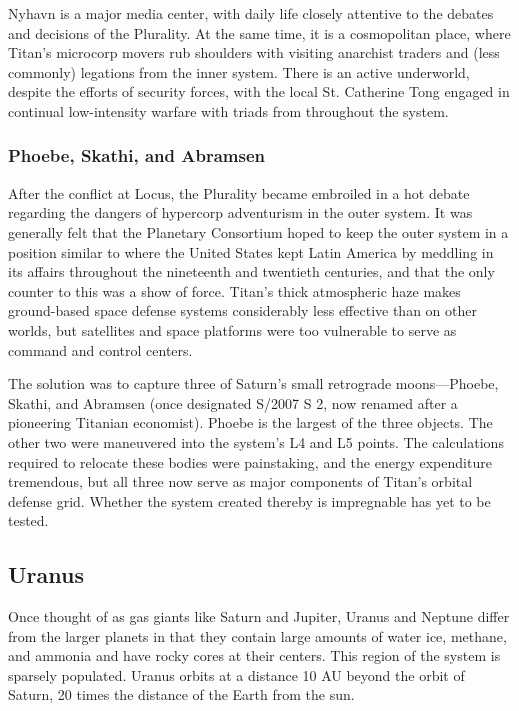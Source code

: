 Nyhavn is a major media center, with daily life closely attentive to the debates and decisions of the Plurality. At the same time, it is a cosmopolitan place, where Titan's microcorp movers rub shoulders with visiting anarchist traders and (less commonly) legations from the inner system. There is an active underworld, despite the efforts of security forces, with the local St. Catherine Tong engaged in continual low-intensity warfare with triads from throughout the system. 

\subsubsection{Phoebe, Skathi, and Abramsen} \label{sec:phoebe-skathi-abrams} 

After the conflict at Locus, the Plurality became embroiled in a hot debate regarding the dangers of hypercorp adventurism in the outer system. It was generally felt that the Planetary Consortium hoped to keep the outer system in a position similar to where the United States kept Latin America by meddling in its affairs throughout the nineteenth and twentieth centuries, and that the only counter to this was a show of force. Titan's thick atmospheric haze makes ground-based space defense systems considerably less effective than on other worlds, but satellites and space platforms were too vulnerable to serve as command and control centers. 

The solution was to capture three of Saturn's small retrograde moons—Phoebe, Skathi, and Abramsen (once designated S/2007 S 2, now renamed after a pioneering Titanian economist). Phoebe is the largest of the three objects. The other two were maneuvered into the system's L4 and L5 points. The calculations required to relocate these bodies were painstaking, and the energy expenditure tremendous, but all three now serve as major components of Titan's orbital defense grid. Whether the system created thereby is impregnable has yet to be tested. 

\subsection{Uranus} \label{sec:uranus} 

Once thought of as gas giants like Saturn and Jupiter, Uranus and Neptune differ from the larger planets in that they contain large amounts of water ice, methane, and ammonia and have rocky cores at their centers. This region of the system is sparsely populated. Uranus orbits at a distance 10 AU beyond the orbit of Saturn, 20 times the distance of the Earth from the sun. 

